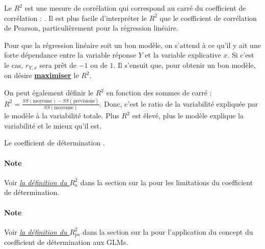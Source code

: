 \documentclass[french]{article}
\begin{document}
\begin{multicols*}{2}
\bigskip

\begin{definitionNOHFILL}
\begin{rappel_enhanced}[Contexte]
Le $R^{2}$ est une mesure de corrélation qui correspond au carré du coefficient de corrélation : . Il est plus facile d'interpréter le $R^{2}$ que le coefficient de corrélation de Pearson, particulièrement pour la régression linéaire.

\bigskip

Pour que la régression linéaire soit un bon modèle, on s'attend à ce qu'il y ait une forte dépendance entre la variable réponse $Y$ et la variable explicative $x$. Si c'est le cas, $r_{Y, x}$ sera prêt de $-1$ ou de $1$. Il s'ensuit que, pour obtenir un bon modèle, on désire \textbf{\underline{maximiser}} le $R^{2}$.

\bigskip

On peut également définir le $R^{2}$ en fonction des sommes de carré : $R^{2} = \frac{SS(\text{moyenne}) - SS(\text{prévisions})}{SS(\text{moyenne})}$. Donc, c'est le ratio de la variabilité expliquée par le modèle à la variabilité totale. Plus $R^{2}$ est élevé, plus le modèle explique la variabilité et le mieux qu'il est.
\end{rappel_enhanced}

Le coefficient de détermination .
\end{definitionNOHFILL}

\paragraph{Note}	Voir \textit{\color{bleudefrance}\underline{\hyperlink{adjustedR2}{\color{bleudefrance} la définition du $R^{2}_{a}$}}} dans la section sur la \textit{\underline{}} pour les limitations du coefficient de détermination.

\paragraph{Note}	Voir \textit{\color{bleudefrance}\underline{\hyperlink{RSquaredPs}{\color{bleudefrance} la définition du $R^{2}_{ps}$}}} dans la section sur la \textit{\underline{}} pour l'application du concept du coefficient de détermination aux GLMs.




\end{multicols*}
\end{document}
